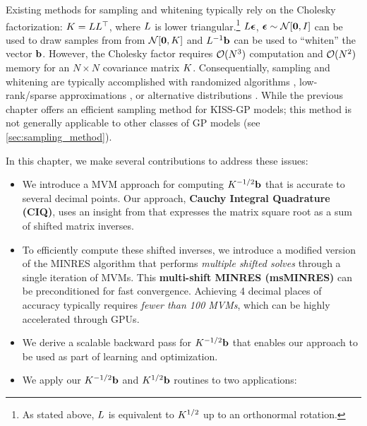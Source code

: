 Existing methods for sampling and whitening typically rely on the Cholesky factorization: $K = L L^\top$, where $L$ is lower triangular.\footnote{
  As stated above, $L$ is equivalent to $K^{1/2}$ up to an orthonormal rotation.
}
$L\boldsymbol{\epsilon}$, $\bepsilon \sim \normaldist{\bzero}{\bI}$ can be used to draw samples from from $\normaldist{\bzero}{\bK}$ and $L^{-1} \mathbf{b}$ can be used to ``whiten'' the vector $\mathbf{b}$.
However, the Cholesky factor requires $\bigo{N^3}$ computation and $\bigo{N^2}$ memory for an $N \times N$ covariance matrix $K$.
Consequentially, sampling and whitening are typically accomplished with randomized algorithms \citep[e.g.][]{rahimi2008random}, low-rank/sparse approximations \citep[e.g.][]{wilson2020efficiently}, or alternative distributions \citep[e.g.][]{wang2017max}.
While the previous chapter offers an efficient sampling method for KISS-GP models; this method is not generally applicable to other classes of GP models (see \cref{sec:sampling_method}).

In this chapter, we make several contributions to address these issues:
%
\begin{itemize}
  \item We introduce a MVM approach for computing $K^{-1 / 2} \mathbf{b}$ that is accurate to several decimal points.
    Our approach, {\bf Cauchy Integral Quadrature (CIQ)}, uses an insight from \citet{hale2008computing} that expresses the matrix square root as a sum of shifted matrix inverses.

  \item To efficiently compute these shifted inverses, we introduce a modified version of the MINRES algorithm \cite{paige1975solution} that performs \emph{multiple shifted solves} through a single iteration of MVMs.
    This {\bf multi-shift MINRES (msMINRES)} can be preconditioned for fast convergence.
    Achieving 4 decimal places of accuracy typically requires \emph{fewer than 100 MVMs}, which can be highly accelerated through GPUs.

  \item We derive a scalable backward pass for $K^{-1/2} \mathbf{b}$ that enables our approach to be used as part of learning and optimization.

  \item We apply our $K^{-1/2} \mathbf{b}$ and $K^{1/2} \mathbf{b}$ routines to two applications:
\end{itemize}
